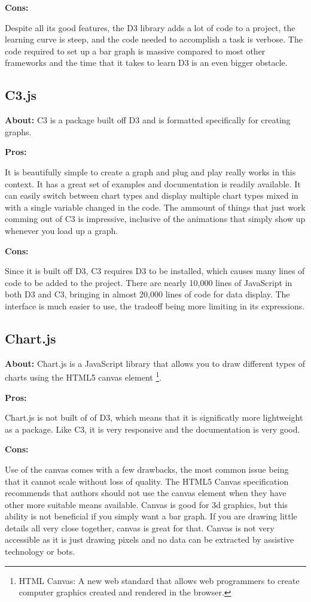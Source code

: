 \documentclass[draftclsnofoot,onecolumn,letterpaper,10pt,compsoc]{IEEEtran}
\begin{document}
  \textbf{Cons:}

  Despite all its good features, the D3 library adds a lot of code to a project, the learning curve is steep, and the code needed to accomplish a task is verbose.
  The code required to set up a bar graph is massive compared to most other frameworks and the time that it takes to learn D3 is an even bigger obstacle.

  \subsection{C3.js}
  \textbf{About:}
  C3 is a package built off D3 and is formatted specifically for creating graphs.

  \textbf{Pros:}

  It is beautifully simple to create a graph and plug and play really works in this context.
  It has a great set of examples and documentation is readily available.
  It can easily switch between chart types and display multiple chart types mixed in with a single variable changed in the code.
  The ammount of things that just work comming out of C3 is impressive, inclusive of the animations that simply show up whenever you load up a graph.

  \textbf{Cons:}

  Since it is built off D3, C3 requires D3 to be installed, which causes many lines of code to be added to the project.
  There are nearly 10,000 lines of JavaScript in both D3 and C3, bringing in almost 20,000 lines of code for data display.
  The interface is much easier to use, the tradeoff being more limiting in its expressions.


  \subsection{Chart.js}
  \textbf{About:}
  Chart.js is a JavaScript library that allows you to draw different types of charts using the HTML5 canvas element
  \footnote{HTML Canvas: A new web standard that allows web programmers to create computer graphics created and rendered in the browser.}.

  \textbf{Pros:}

  Chart.js is not built of of D3, which means that it is significatly more lightweight as a package. Like C3, it is very responsive and the documentation is very good.

  \textbf{Cons:}

  Use of the canvas comes with a few drawbacks, the most common issue being that it cannot scale without loss of quality.
  The HTML5 Canvas specification recommends that authors should not use the canvas element when they have other more suitable means available.\cite{CanvasVsSVG}
  Canvas is good for 3d graphics, but this ability is not beneficial if you simply want a bar graph.
  If you are drawing little details all very close together, canvas is great for that.
  Canvas is not very accessible as it is just drawing pixels and no data can be extracted by assistive technology or bots.
\end{document}
